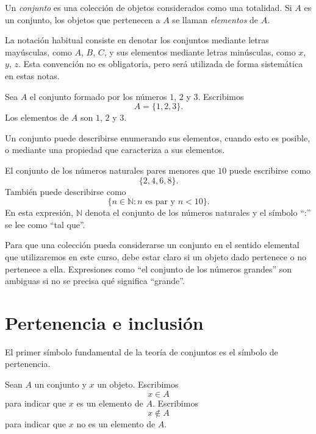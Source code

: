 \begin{definicion}
Un \emph{conjunto} es una colección de objetos considerados como una totalidad. Si \(A\) es un conjunto, los objetos que pertenecen a \(A\) se llaman \emph{elementos} de \(A\).
\end{definicion}

La notación habitual consiste en denotar los conjuntos mediante letras mayúsculas, como \(A\), \(B\), \(C\), y sus elementos mediante letras minúsculas, como \(x\), \(y\), \(z\). Esta convención no es obligatoria, pero será utilizada de forma sistemática en estas notas.

\begin{ejemplo}
Sea \(A\) el conjunto formado por los números \(1\), \(2\) y \(3\). Escribimos
\[
  A=\{1,2,3\}.
\]
Los elementos de \(A\) son \(1\), \(2\) y \(3\).
\end{ejemplo}

Un conjunto puede describirse enumerando sus elementos, cuando esto es posible, o mediante una propiedad que caracteriza a sus elementos.

\begin{ejemplo}
El conjunto de los números naturales pares menores que \(10\) puede escribirse como
\[
  \{2,4,6,8\}.
\]
También puede describirse como
\[
  \{n\in\mathbb{N}: n \text{ es par y } n<10\}.
\]
En esta expresión, \(\mathbb{N}\) denota el conjunto de los números naturales y el símbolo ``:'' se lee como ``tal que''.
\end{ejemplo}

\begin{advertencia}
Para que una colección pueda considerarse un conjunto en el sentido elemental que utilizaremos en este curso, debe estar claro si un objeto dado pertenece o no pertenece a ella. Expresiones como ``el conjunto de los números grandes'' son ambiguas si no se precisa qué significa ``grande''.
\end{advertencia}

\section{Pertenencia e inclusión}

El primer símbolo fundamental de la teoría de conjuntos es el símbolo de pertenencia.

\begin{definicion}[Pertenencia]
Sean \(A\) un conjunto y \(x\) un objeto. Escribimos
\[
  x\in A
\]
para indicar que \(x\) es un elemento de \(A\). Escribimos
\[
  x\notin A
\]
para indicar que \(x\) no es un elemento de \(A\).
\end{definicion}

